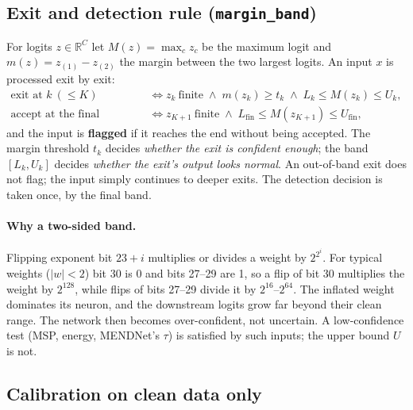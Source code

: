 \documentclass[10pt,a4paper]{article}
\newcommand{\meth}[1]{\texttt{#1}}
\newcommand{\ours}{\meth{margin\_band}}
\begin{document}
\subsection{Exit and detection rule (\ours)}\label{sec:rule}

For logits $z\in\mathbb{R}^{C}$ let $M(z)=\max_c z_c$ be the maximum logit and
$m(z)=z_{(1)}-z_{(2)}$ the margin between the two largest logits. An input $x$ is processed exit by exit:
\begin{align}
  \text{exit at }k\ (\le K) &\iff z_k\ \text{finite} \;\wedge\; m(z_k)\ge t_k \;\wedge\; L_k\le M(z_k)\le U_k,
  \label{eq:exit}\\
  \text{accept at the final classifier} &\iff z_{K+1}\ \text{finite} \;\wedge\; L_{\mathrm{fin}}\le M(z_{K+1})\le U_{\mathrm{fin}},
  \label{eq:final}
\end{align}
and the input is \textbf{flagged} if it reaches the end without being accepted. The margin threshold $t_k$
decides \emph{whether the exit is confident enough}; the band $[L_k,U_k]$ decides \emph{whether the exit's
output looks normal}. An out-of-band exit does not flag; the input simply continues to deeper exits. The
detection decision is taken once, by the final band.

\paragraph{Why a two-sided band.} Flipping exponent bit $23+i$ multiplies or divides a weight by
$2^{2^i}$. For typical weights ($|w|<2$) bit 30 is 0 and bits 27--29 are 1, so a flip of bit 30 multiplies
the weight by $2^{128}$, while flips of bits 27--29 divide it by $2^{16}$--$2^{64}$. The inflated weight
dominates its neuron, and the downstream logits grow far beyond their clean range. The network then becomes over-confident, not uncertain. A low-confidence test (MSP,
energy, MENDNet's $\tau$) is satisfied by such inputs; the upper bound $U$ is not.

\subsection{Calibration on clean data only}\label{sec:calib}
\end{document}
